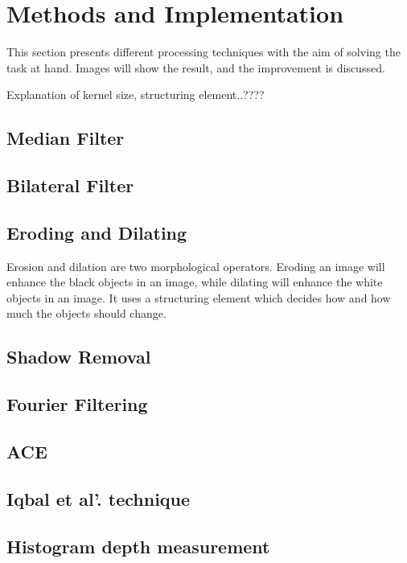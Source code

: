 \section{Methods and Implementation}\label{methods and implementation}

This section presents different processing techniques with the aim of solving the task at hand. Images will show the result, and the improvement is discussed. 

{\color{red}Explanation of kernel size, structuring element..????}


\subsection{Median Filter}


\subsection{Bilateral Filter}


\subsection{Eroding and Dilating}
Erosion and dilation are two morphological operators. Eroding an image will enhance the black objects in an image, while dilating will enhance the white objects in an image. It uses a structuring element which decides how and how much the objects should change. 


\subsection{Shadow Removal}


\subsection{Fourier Filtering}


\subsection{ACE}


\subsection{Iqbal et al'. technique}


\subsection{Histogram depth measurement}